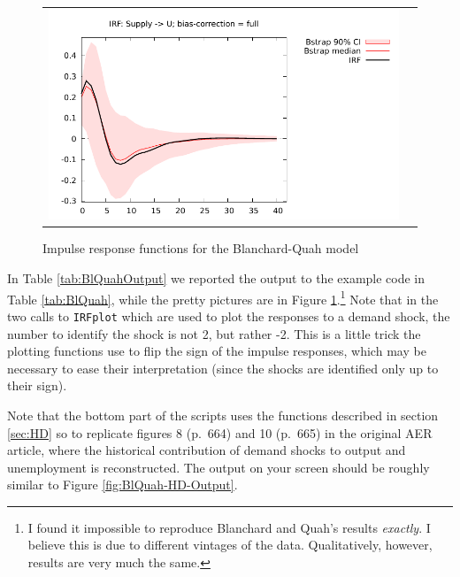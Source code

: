 \documentclass[a4paper,10pt]{article}
\newcounter{script}[section]
\newlength{\irfw}
\newlength{\irfh}
\begin{document}
\begin{figure}[htbp]
\begin{tabular}{cc}
    \includegraphics[width=\irfw, height=\irfh]{bq_us}
  \end{tabular}
  \caption{Impulse response functions for the Blanchard-Quah model}
  \label{fig:BlQuah}
\end{figure}

In Table \ref{tab:BlQuahOutput} we reported the output to the example
code in Table \ref{tab:BlQuah}, while the pretty pictures are in
Figure \ref{fig:BlQuah}.\footnote{I found it impossible to reproduce
  Blanchard and Quah's results \emph{exactly}. I believe this is due
  to different vintages of the data. Qualitatively, however, results
  are very much the same. } Note that in the two calls to
\texttt{IRFplot} which are used to plot the responses to a demand
shock, the number to identify the shock is not 2, but rather -2. This
is a little trick the plotting functions use to flip the sign of the
impulse responses, which may be necessary to ease their interpretation
(since the shocks are identified only up to their sign).

Note that the bottom part of the scripts uses the functions described
in section \ref{sec:HD} so to replicate figures 8 (p.~664) and 10
(p.~665) in the original AER article, where the historical
contribution of demand shocks to output and unemployment is
reconstructed. The output on your screen should be roughly similar to
Figure \ref{fig:BlQuah-HD-Output}.
\end{document}
